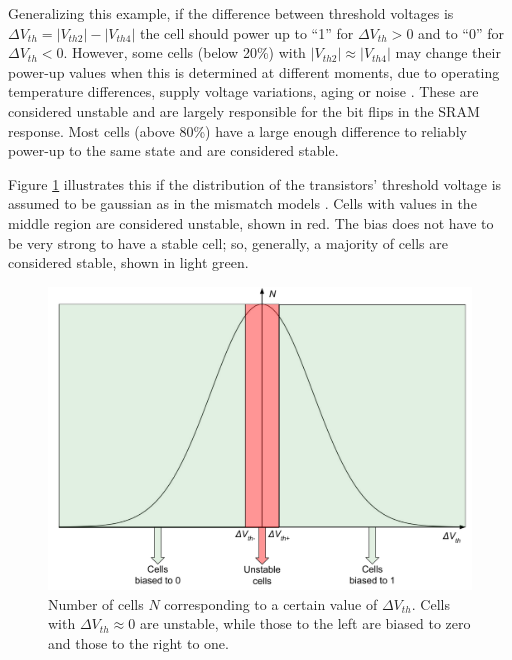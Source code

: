  Generalizing this example, if the difference between threshold voltages is $\Delta V_{th}=|V_{th2}|-|V_{th4}|$ the cell should power up to ``1'' for $\Delta V_{th}>0$ and to ``0'' for $\Delta V_{th}<0$. However, some cells (below 20\%) with $|V_{th2}|\approx|V_{th4}|$ may change their power-up values when this is determined at different moments, due to operating temperature differences, supply voltage variations, aging or noise \cite{Baturone2015}. These are considered unstable and are largely responsible for the bit flips in the SRAM response. Most cells (above 80\%) have a large enough difference to reliably power-up to the same state and are considered stable.
 
 Figure \ref{fig:celldistribution} illustrates this if the distribution of the transistors' threshold voltage is assumed to be gaussian as in the mismatch models \cite{Hofer2010}. Cells with values in the middle region are considered unstable, shown in red. The bias does not have to be very strong to have a stable cell; so, generally, a majority of cells are considered stable, shown in light green. 

\begin{figure}[t]
    \centering
    \includegraphics[width=14cm]{images/Cell distribution.pdf}
    \caption{Number of cells $N$ corresponding to a certain value of $\Delta V_{th}$. Cells with $\Delta V_{th} \approx 0 $ are unstable, while those to the left are biased to zero and those to the right to one.}
    \label{fig:celldistribution}
\end{figure}


